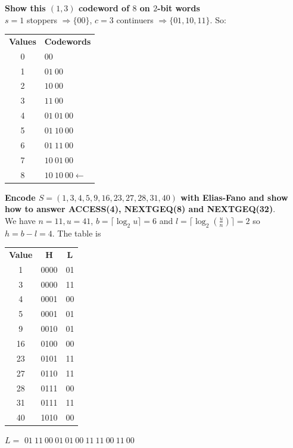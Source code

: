\documentclass[10pt]{report}
\begin{document}
\begin{list}{}{}
\begin{list}{}{}
	\end{list}
	\item \textbf{Show this $(1,3)$ codeword of $8$ on $2$-bit words}\\
	$s = 1$ stoppers $\Rightarrow \{00\}$, $c = 3$ continuers $\Rightarrow \{01,10,11\}$. So:\\
	\begin{center}
		\begin{tabular}{c l}
		\textbf{Values} & \textbf{Codewords}\\
		0 & $00\:$\\
		1 & $01\:00$\\
		2 & $10\:00$\\
		3 & $11\:00$\\
		4 & $01\:01\:00$\\
		5 & $01\:10\:00$\\
		6 & $01\:11\:00$\\
		7 & $10\:01\:00$\\
		8 & $10\:10\:00 \longleftarrow$\\
	\end{tabular}
	\end{center}
	\item \textbf{Encode $S=(1,3,4,5,9,16,23,27,28,31,40)$ with Elias-Fano and show how to answer ACCESS(4), NEXTGEQ(8) and NEXTGEQ(32)}.\\
	We have $n = 11, u = 41$, $b = \lceil\log_2 u\rceil = 6$ and $l = \lceil\log_2(\frac{u}{n})\rceil = 2$ so $h = b-l=4$. The table is \begin{center}
		\begin{tabular}{c c c}
			\textbf{Value} & \textbf{H} & \textbf{L}\\
			1 & 0000 & 01\\
			3 & 0000 & 11\\
			4 & 0001 & 00\\
			5 & 0001 & 01\\
			9 & 0010 & 01\\
			16 & 0100 & 00\\
			23 & 0101 & 11\\
			27 & 0110 & 11\\
			28 & 0111 & 00\\
			31 & 0111 & 11\\
			40 & 1010 & 00\\
		\end{tabular}
	\end{center}
	\begin{list}{}{}
		\item[$L =$] $01\:11\:00\:01\:01\:00\:11\:11\:00\:11\:00$

\end{list}
\end{list}
\end{document}
